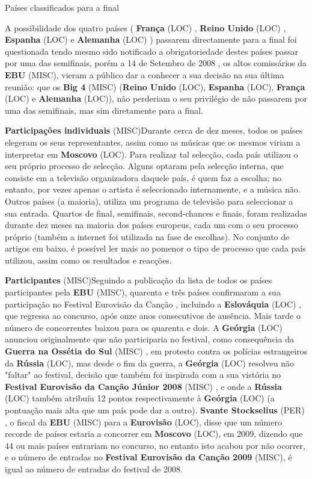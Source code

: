 \documentclass[12pt,a4paper]{article}
\begin{document}
Países classificados para a final

A possibilidade dos quatro países ( \textbf{França} (LOC) , \textbf{Reino Unido} (LOC) , \textbf{Espanha} (LOC) e \textbf{Alemanha} (LOC) ) passarem directamente para a final foi questionada tendo mesmo sido notificado a obrigatoriedade destes países passar por uma das semifinais, porém a 14 de Setembro de 2008 , os altos comissários da \textbf{EBU} (MISC), vieram a público dar a conhecer a sua decisão na sua última reunião: que os \textbf{Big 4} (MISC) (\textbf{Reino Unido} (LOC), \textbf{Espanha} (LOC), \textbf{França} (LOC) e \textbf{Alemanha} (LOC)), não perderiam o seu privilégio de não passarem por uma das semifinais, mas sim diretamente para a final.



\textbf{Participações individuais} (MISC)Durante cerca de dez meses, todos os países elegeram os seus representantes, assim como as músicas que os mesmos viriam a interpretar em \textbf{Moscovo} (LOC). Para realizar tal selecção, cada país utilizou o seu próprio processo de selecção. Alguns optaram pela selecção interna, que consiste em a televisão organizadora daquele país, é quem faz a escolha; no entanto, por vezes apenas o artista é seleccionado internamente, e a música não. Outros países (a maioria), utiliza um programa de televisão para seleccionar a sua entrada. Quartos de final, semifinais, second-chances e finais, foram realizadas durante dez meses na maioria dos países europeus, cada um com o seu processo próprio (também a internet foi utilizada na fase de escolhas). No conjunto de artigos em baixo, é possível ler mais ao pomenor o tipo de processo que cada país utilizou, assim como os resultados e reacções.



\textbf{Participantes} (MISC)Seguindo a publicação da lista de todos os países participantes pela \textbf{EBU} (MISC), quarenta e três países confirmaram a sua participação no Festival Eurovisão da Canção , incluindo a \textbf{Eslováquia} (LOC) , que regressa ao concurso, após onze anos consecutivos de ausência. Mais tarde o número de concorrentes baixou para os quarenta e dois. A \textbf{Geórgia} (LOC) anunciou originalmente que não participaria no festival, como consequência da \textbf{Guerra na Ossétia do Sul} (MISC) , em protesto contra os polícias estrangeiros da \textbf{Rússia} (LOC), mas desde o fim da guerra, a \textbf{Geórgia} (LOC) resolveu não "faltar" ao festival, decisão que também foi inspirada com a sua vistória no \textbf{Festival Eurovisão da Canção Júnior 2008} (MISC) , e onde a \textbf{Rússia} (LOC) também atribuíu 12 pontos respectivamente à \textbf{Geórgia} (LOC) (a pontuação mais alta que um país pode dar a outro). \textbf{Svante Stockselius} (PER) , o fiscal da \textbf{EBU} (MISC) para a \textbf{Eurovisão} (LOC), disse que um número recorde de países estaria a concorrer em \textbf{Moscovo} (LOC), em 2009, dizendo que 44 ou mais países entrariam no concurso, no entanto isto acabou por não ocorrer, e o número de entradas no \textbf{Festival Eurovisão da Canção 2009} (MISC), é igual ao número de entradas do festival de 2008.
\end{document}
